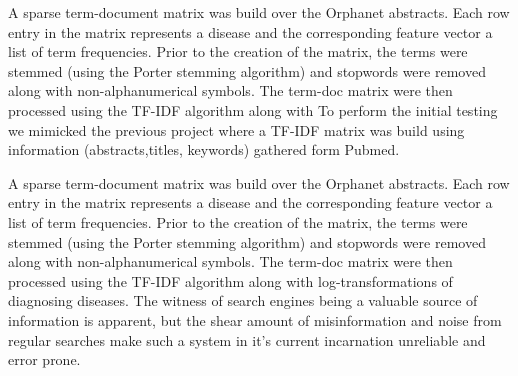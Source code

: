 \documentclass[10pt,letterpaper,draft]{article}
\begin{document}
A sparse term-document matrix was build over the Orphanet abstracts. Each row entry in the matrix represents a disease and the corresponding feature vector a list of term frequencies. Prior to the creation of the matrix, the terms were stemmed (using the Porter stemming algorithm) and stopwords were removed along with non-alphanumerical symbols. The term-doc matrix were then processed using the TF-IDF algorithm along with To perform the initial testing we mimicked the previous project where a TF-IDF matrix was build using information (abstracts,titles, keywords) gathered form Pubmed. 

A sparse term-document matrix was build over the Orphanet abstracts. Each row entry in the matrix represents a disease and the corresponding feature vector a list of term frequencies. Prior to the creation of the matrix, the terms were stemmed (using the Porter stemming algorithm) and stopwords were removed along with non-alphanumerical symbols. The term-doc matrix were then processed using the TF-IDF algorithm along with log-transformations  of diagnosing
diseases. The witness of search engines being a valuable source of
information is apparent, but the shear amount of misinformation and
noise from regular searches make such a system in it’s current
incarnation unreliable and error prone.






\end{document}
